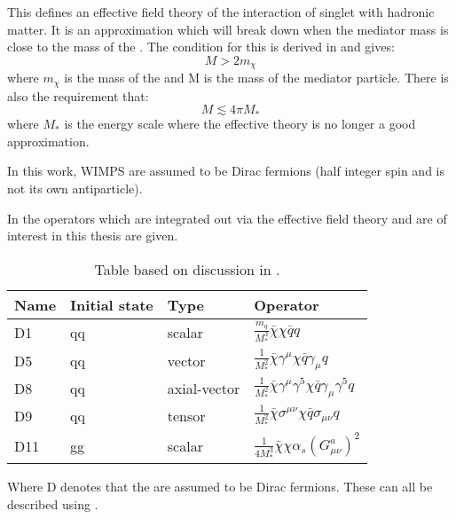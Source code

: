 This defines an effective field theory of the interaction of singlet \abbrWIMPS with hadronic matter. It is an approximation which will break down when the mediator mass is close to the mass of the \abbrWIMP .
The condition for this is derived in \citep{82.116010} and gives:
\begin{equation}
M > 2 m_\chi
\end{equation}
where $m_\chi$ is the mass of the \abbrWIMP and M is the mass of the mediator particle. There is also the requirement that:
\begin{equation}
M \lesssim 4 \pi M_*
\end{equation}
where $M_*$ is the energy scale where the effective theory is no longer a good approximation.

In this work, WIMPS are assumed to be Dirac fermions (half integer spin and is not its own antiparticle). 
 
In  the operators which are integrated out via the effective field theory and are of interest in this thesis are given.
\renewcommand{\arraystretch}{1.5} %
\begin{table}[H]
\begin{center}
    \begin{tabular}{ | l | l | l | l |}
    \hline
    Name & Initial state & Type & Operator \\ \hline
  	D1 & qq & scalar & $\frac{m_q}{M^3_*} \bar{\chi} \chi \bar{q} q$ \\ \hline
  	D5 & qq & vector & $\frac{1}{M^2_*} \bar{\chi} \gamma^\mu \chi \bar{q} \gamma_\mu q$ \\ \hline
  	D8 & qq & axial-vector & $\frac{1}{M^2_*}\bar{\chi}\gamma^\mu \gamma^5 \chi \bar{q} \gamma_\mu \gamma^5 q $ \\ \hline
  	D9 & qq & tensor & $\frac{1}{M^2_*} \bar{\chi}\sigma^{\mu \nu} \chi \bar{q} \sigma_{\mu \nu} q  $\\ \hline
  	D11 & gg & scalar & $\frac{1}{4M^3_*}\bar{\chi}\chi \alpha_s (G^a_{\mu \nu})^2 $\\ \hline
  	\end{tabular}

  	\caption{Table based on discussion in \citep{CERN-PH-EP-2012-210}.}
  	\label{tab:operators}
  	  	\end{center}
    \end{table}
\renewcommand{\arraystretch}{1.0}  %
Where D denotes that the \abbrWIMPS are assumed to be Dirac fermions. These can all be described using .

